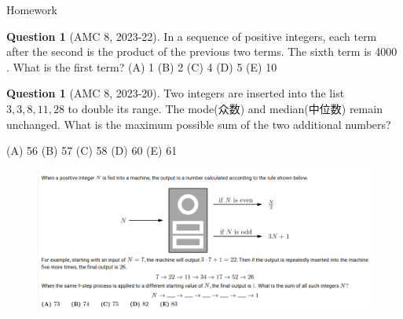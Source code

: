 \documentclass{beamer}
\theoremstyle{definition}
\newtheorem{ques}[defn]{Question}
\begin{document}


\begin{frame}{Homework}
    \begin{ques}[AMC 8, 2023-22]
        In a sequence of positive integers, each term after the second is the product of the previous two terms. The sixth term is 4000 . What is the first term?
        (A) 1 (B) 2 (C) 4 (D) 5 (E) 10
    \end{ques}
    \begin{ques}[AMC 8, 2023-20]
        Two integers are inserted into the list $3,3,8,11,28$ to double its range. The mode(众数) and median(中位数) remain unchanged. What is the maximum possible sum of the two additional numbers?
          
        (A) 56 (B) 57 (C) 58 (D) 60 (E) 61
    \end{ques}
\end{frame}
\begin{frame}
    \begin{figure}
        \centering
        \includegraphics[width=1\textwidth]{3n+1.png}
    \end{figure}
\end{frame}
\end{document}
